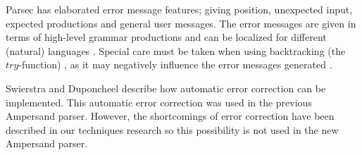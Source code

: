 Parsec has elaborated error message features; giving position, unexpected input, expected productions and general user messages.
The error messages are given in terms of high-level grammar productions and can be localized for different (natural) languages .
Special care must be taken when using backtracking (the $try$-function) , as it may negatively influence the error messages generated .

Swierstra and Duponcheel  describe how automatic error correction can be implemented.
This automatic error correction was used in the previous Ampersand parser.
However, the shortcomings of error correction have been described in our techniques research \cite{parsing} so this possibility is not used in the new Ampersand parser.
